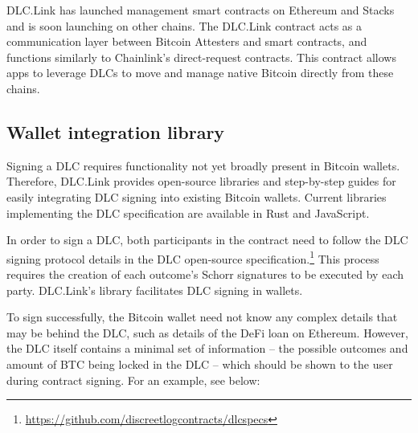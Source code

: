 \documentclass[twoside, a4paper, 11pt]{article}
\begin{document}
  DLC.Link has launched management smart contracts on Ethereum and Stacks and is soon launching on other chains. The DLC.Link contract acts as a communication layer between Bitcoin Attesters and smart contracts, and functions similarly to Chainlink’s direct-request contracts. This contract allows apps to leverage DLCs to move and manage native Bitcoin directly from these chains.

  \subsection{Wallet integration library}

  Signing a DLC requires functionality not yet broadly present in Bitcoin wallets. Therefore, DLC.Link provides open-source libraries and step-by-step guides for easily integrating DLC signing into existing Bitcoin wallets. Current libraries implementing the DLC specification are available in Rust and JavaScript.

  In order to sign a DLC, both participants in the contract need to follow the DLC signing protocol details in the DLC open-source specification.\footnote{\url{https://github.com/discreetlogcontracts/dlcspecs}} This process requires the creation of each outcome’s Schorr signatures to be executed by each party. DLC.Link’s library facilitates DLC signing in wallets.

  To sign successfully, the Bitcoin wallet need not know any complex details that may be behind the DLC, such as details of the DeFi loan on Ethereum. However, the DLC itself contains a minimal set of information – the possible outcomes and amount of BTC being locked in the DLC – which should be shown to the user during contract signing. For an example, see below:
\end{document}
